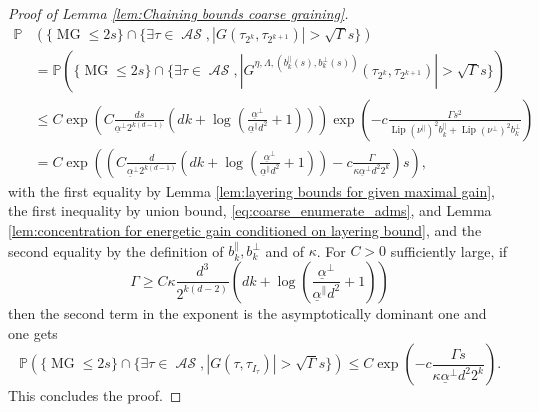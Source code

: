 \documentclass[11pt, reqno]{amsart}
\DeclareMathOperator{\lip}{Lip}
\DeclareMathOperator{\MG}{MG}
\DeclareMathOperator{\AS}{\mathcal{AS}}
\renewcommand{\P}{\mathbb{P}}
\numberwithin{equation}{section}
\begin{document}
\begin{proof}[Proof of Lemma \ref{lem:Chaining bounds coarse graining}]
\begin{align*}
\P&\left( \{\MG\leq 2s \} \cap \{\exists \tau \in \AS, |G(\tau_{2^{k}}, \tau_{2^{k+1}})|>\sqrt{\Gamma} s \} \right)\\
&=\P \left( \{\MG\leq 2s \} \cap \{\exists \tau \in \AS, |G^{\eta, \Lambda, (b^{\parallel}_{k}(s),b^{\perp}_{k}(s))}(\tau_{2^{k}},\tau_{2^{k+1}})|>\sqrt{\Gamma} s \} \right) \\
&\leq C\exp \left(C \frac{d s}{\underline{\alpha}^{\perp} 2^{k(d-1)}}  \left(dk+\log\left(\frac{\underline{\alpha}^{\perp}}{\underline{\alpha}^{\parallel}d^2}+1 \right)\right)\right) \exp \left(-c\frac{\Gamma s^2}{ \lip(\nu^{\parallel})^{2} b^{\parallel}_{k}+\lip(\nu^{\perp})^{2} b^{\perp}_{k} } \right) \\
&= C\exp \left( \left( C \frac{d }{\underline{\alpha}^{\perp} 2^{k(d-1)}}  \left(dk +\log\left(\frac{\underline{\alpha}^{\perp}}{\underline{\alpha}^{\parallel}d^2}+1 \right)\right)-c\frac{\Gamma }{\kappa \underline{\alpha}^{\perp} d^2 2^k}\right)s \right),
\end{align*}
with the first equality by Lemma \ref{lem:layering bounds for given maximal gain}, the first inequality by union bound, 
\eqref{eq:coarse_enumerate_adms}, and Lemma \ref{lem:concentration for energetic gain conditioned on layering bound}, 
and the second equality by the definition of $b^{\parallel}_{k},b^{\perp}_{k}$ and of $\kappa$.
For $C>0$ sufficiently large, if 
\begin{equation*}
\Gamma \geq C \kappa \frac{d^3}{2^{k(d-2)}}\left(dk +\log\left(\frac{\underline{\alpha}^{\perp}}{\underline{\alpha}^{\parallel}d^2}+1 \right)\right)
\end{equation*}
then the second term in the exponent is the asymptotically dominant one and one gets
\begin{equation*}
\P\left( \{\MG\leq 2s \} \cap \{\exists \tau \in \AS, |G(\tau,\tau_{I_{\tau}})|>\sqrt{\Gamma} s \} \right) \leq C\exp \left(-c\frac{\Gamma s} {\kappa \underline{\alpha}^{\perp} d^{2} 2^{k}}  \right).
\end{equation*}
This concludes the proof.
\end{proof}
\end{document}
